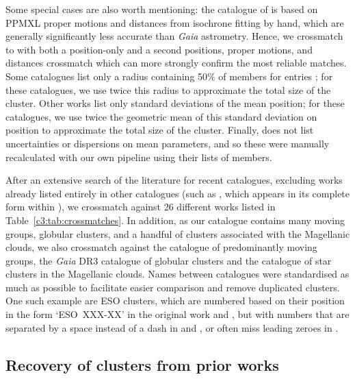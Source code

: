 Some special cases are also worth mentioning: the catalogue of \cite{kharchenko_global_2013} is based on PPMXL proper motions and distances from isochrone fitting by hand, which are generally significantly less accurate than \emph{Gaia} astrometry. Hence, we crossmatch to \cite{kharchenko_global_2013} with both a position-only and a second positions, proper motions, and distances crossmatch which can more strongly confirm the most reliable matches. Some catalogues list only a radius containing 50\% of members for entries \citep[e.g.][]{cantat-gaudin_clusters_2020}; for these catalogues, we use twice this radius to approximate the total size of the cluster. Other works \citep[e.g.][]{castro-ginard_hunting_2020, he_new_2022} list only standard deviations of the mean position; for these catalogues, we use twice the geometric mean of this standard deviation on position to approximate the total size of the cluster. Finally, \cite{kounkel_untangling_2020} does not list uncertainties or dispersions on mean parameters, and so these were manually recalculated with our own pipeline using their lists of members.

After an extensive search of the literature for recent catalogues, excluding works already listed entirely in other catalogues (such as \cite{froebrich_systematic_2007}, which appears in its complete form within \cite{bica_multi-band_2018}), we crossmatch against 26 different works listed in Table~\ref{c3:tab:crossmatches}. In addition, as our catalogue contains many moving groups, globular clusters, and a handful of clusters associated with the Magellanic clouds, we also crossmatch against the \cite{kounkel_untangling_2020} catalogue of predominantly moving groups, the \cite{vasiliev_gaia_2021} \emph{Gaia} DR3 catalogue of globular clusters and the \cite{bica_general_2008} catalogue of star clusters in the Magellanic clouds. Names between catalogues were standardised as much as possible to facilitate easier comparison and remove duplicated clusters. One such example are ESO clusters, which are numbered based on their position in the form `ESO~XXX-XX' in the original work and \cite{kharchenko_global_2013}, but with numbers that are separated by a space instead of a dash in \cite{cantat-gaudin_clusters_2020} and \cite{dias_new_2002}, or often miss leading zeroes in \cite{bica_multi-band_2018}.

\subsection{Recovery of clusters from prior works}

